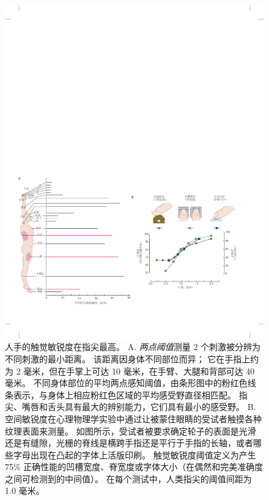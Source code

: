 \begin{figure}[htbp]
	\centering
	\includegraphics[width=1.0\linewidth]{chap19/fig_19_6}
	\caption{人手的触觉敏锐度在指尖最高。
		A. \textit{两点阈值}测量 2 个刺激被分辨为不同刺激的最小距离。
		该距离因身体不同部位而异；
		它在手指上约为 2 毫米，但在手掌上可达 10 毫米，在手臂、大腿和背部可达 40 毫米。
		不同身体部位的平均两点感知阈值，由条形图中的粉红色线条表示，与身体上相应粉红色区域的平均感受野直径相匹配。
		指尖、嘴唇和舌头具有最大的辨别能力，它们具有最小的感受野\cite{weinstein1968intensive}。
		B. 空间敏锐度在心理物理学实验中通过让被蒙住眼睛的受试者触摸各种纹理表面来测量。
		如图所示，受试者被要求确定轮子的表面是光滑还是有缝隙，光栅的脊线是横跨手指还是平行于手指的长轴，或者哪些字母出现在凸起的字体上活版印刷。
		触觉敏锐度阈值定义为产生 75\% 正确性能的凹槽宽度、脊宽度或字体大小（在偶然和完美准确度之间可检测到的中间值）。
		在每个测试中，人类指尖的阈值间距为 1.0 毫米\cite{johnson1981tactile}。}
	\label{fig:19_6}
\end{figure}


